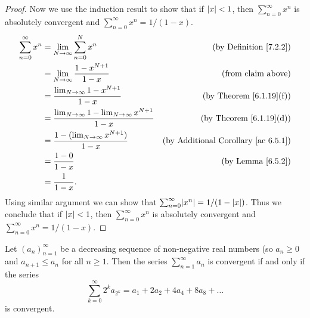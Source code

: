 \begin{proof}
    Now we use the induction result to show that if \(\abs*{x} < 1\), then \(\sum_{n = 0}^\infty x^n\) is absolutely convergent and \(\sum_{n = 0}^\infty x^n = 1 / (1 - x)\).
    \begin{align*}
        \sum_{n = 0}^\infty x^n & = \lim_{N \to \infty} \sum_{n = 0}^N x^n                              & \text{(by Definition \ref{7.2.2})}              \\
                                & = \lim_{N \to \infty} \frac{1 - x^{N + 1}}{1 - x}                     & \text{(from claim above)}                       \\
                                & = \frac{\lim_{N \to \infty} 1 - x^{N + 1}}{1 - x}                     & \text{(by Theorem \ref{6.1.19}(f))}             \\
                                & = \frac{\lim_{N \to \infty} 1 - \lim_{N \to \infty} x^{N + 1}}{1 - x} & \text{(by Theorem \ref{6.1.19}(d))}             \\
                                & = \frac{1 - (\lim_{N \to \infty} x^{N + 1})}{1 - x}                   & \text{(by Additional Corollary \ref{ac 6.5.1})} \\
                                & = \frac{1 - 0}{1 - x}                                                 & \text{(by Lemma \ref{6.5.2})}                   \\
                                & = \frac{1}{1 - x}.
    \end{align*}
    Using similar argument we can show that \(\sum_{n = 0}^\infty \abs*{x^n} = 1 / (1 - \abs*{x})\).
    Thus we conclude that if \(\abs*{x} < 1\), then \(\sum_{n = 0}^\infty x^n\) is absolutely convergent and \(\sum_{n = 0}^\infty x^n = 1 / (1 - x)\).
\end{proof}

\begin{proposition}\label{7.3.4}
    Let \((a_n)_{n = 1}^\infty\) be a decreasing sequence of non-negative real numbers (so \(a_n \geq 0\) and \(a_{n + 1} \leq a_n\) for all \(n \geq 1\).
    Then the series \(\sum_{n = 1}^\infty a_n\) is convergent if and only if the series
    \[
        \sum_{k = 0}^\infty 2^k a_{2^k} = a_1 + 2a_2 + 4a_4 + 8a_8 + \dots
    \]
    is convergent.
\end{proposition}

